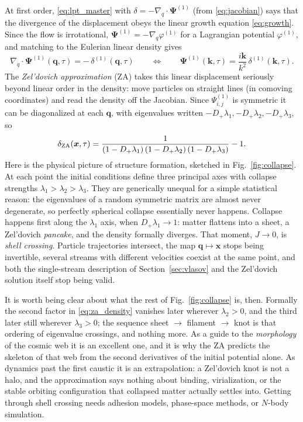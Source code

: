 \documentclass[a4paper,11pt]{article}
\newcommand{\vx}{\bm{x}}
\newcommand{\vq}{\bm{q}}
\newcommand{\vk}{\bm{k}}
\newcommand{\vPsi}{\bm{\Psi}}
\numberwithin{equation}{section}
\begin{document}
At first order, \eqref{eq:lpt_master} with $\delta = -\nabla_q\cdot\vPsi^{(1)}$ (from \eqref{eq:jacobian}) says that the divergence of the displacement obeys the linear growth equation \eqref{eq:growth}. Since the flow is irrotational, $\vPsi^{(1)} = -\nabla_q\varphi^{(1)}$ for a Lagrangian potential $\varphi^{(1)}$, and matching to the Eulerian linear density gives
\begin{equation}
\nabla_q\cdot\vPsi^{(1)}(\vq,\tau) = -\,\delta^{(1)}(\vq,\tau)
\qquad\Longleftrightarrow\qquad
\vPsi^{(1)}(\vk,\tau) = \frac{i\vk}{k^2}\,\delta^{(1)}(\vk,\tau) .
\label{eq:za_displacement}
\end{equation}
The \emph{Zel'dovich approximation} (ZA) \cite{Zeldovich1970} takes this linear displacement seriously beyond linear order in the density: move particles on straight lines (in comoving coordinates) and read the density off the Jacobian. Since $\Psi^{(1)}_{i,j}$ is symmetric it can be diagonalized at each $\vq$, with eigenvalues written $-D_+\lambda_1, -D_+\lambda_2, -D_+\lambda_3$, so
\begin{equation}
\delta_{\rm ZA}(\vx,\tau)
= \frac{1}{\left(1-D_+\lambda_1\right)\left(1-D_+\lambda_2\right)\left(1-D_+\lambda_3\right)} - 1 .
\label{eq:za_density}
\end{equation}
Here is the physical picture of structure formation, sketched in Fig.~\ref{fig:collapse}. At each point the initial conditions define three principal axes with collapse strengths $\lambda_1 > \lambda_2 > \lambda_3$. They are generically unequal for a simple statistical reason: the eigenvalues of a random symmetric matrix are almost never degenerate, so perfectly spherical collapse essentially never happens. Collapse happens first along the $\lambda_1$ axis, when $D_+\lambda_1 \to 1$: matter flattens into a sheet, a Zel'dovich \emph{pancake}, and the density formally diverges. That moment, $J \to 0$, is \emph{shell crossing}. Particle trajectories intersect, the map $\vq\mapsto\vx$ stops being invertible, several streams with different velocities coexist at the same point, and both the single-stream description of Section~\ref{sec:vlasov} and the Zel'dovich solution itself stop being valid.

It is worth being clear about what the rest of Fig.~\ref{fig:collapse} is, then. Formally the second factor in \eqref{eq:za_density} vanishes later wherever $\lambda_2>0$, and the third later still wherever $\lambda_3>0$; the sequence sheet $\rightarrow$ filament $\rightarrow$ knot is that ordering of eigenvalue crossings, and nothing more. As a guide to the \emph{morphology} of the cosmic web it is an excellent one, and it is why the ZA predicts the skeleton of that web from the second derivatives of the initial potential alone. As dynamics past the first caustic it is an extrapolation: a Zel'dovich knot is not a halo, and the approximation says nothing about binding, virialization, or the stable orbiting configuration that collapsed matter actually settles into. Getting through shell crossing needs adhesion models, phase-space methods, or $N$-body simulation.
\end{document}
